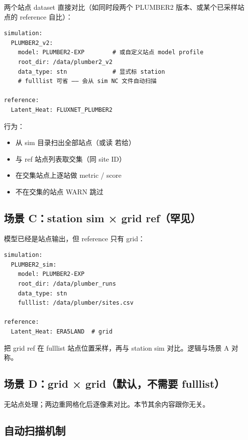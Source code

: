 两个站点 dataset 直接对比（如同时段两个 PLUMBER2 版本、或某个已采样站点的 reference 自比）：

\begin{verbatim}
simulation:
  PLUMBER2_v2:
    model: PLUMBER2-EXP        # 或自定义站点 model profile
    root_dir: /data/plumber2_v2
    data_type: stn             # 显式标 station
    # fulllist 可省 —— 会从 sim NC 文件自动扫描

reference:
  Latent_Heat: FLUXNET_PLUMBER2
\end{verbatim}

\openbench{} 行为：

\begin{itemize}
  \item 从 sim 目录扫出全部站点（或读  若给）
  \item 与 ref 站点列表取交集（同 site ID）
  \item 在交集站点上逐站做 metric / score
  \item 不在交集的站点 WARN 跳过
\end{itemize}


\subsection{场景 C：station sim × grid ref（罕见）}

模型已经是站点输出，但 reference 只有 grid：

\begin{verbatim}
simulation:
  PLUMBER2_sim:
    model: PLUMBER2-EXP
    root_dir: /data/plumber_runs
    data_type: stn
    fulllist: /data/plumber/sites.csv

reference:
  Latent_Heat: ERA5LAND  # grid
\end{verbatim}

\openbench{} 把 grid ref 在 fulllist 站点位置采样，再与 station sim 对比。逻辑与场景 A 对称。

\subsection{场景 D：grid × grid（默认，不需要 fulllist）}

无站点处理；两边重网格化后逐像素对比。本节其余内容跟你无关。

\subsection{自动扫描机制}

